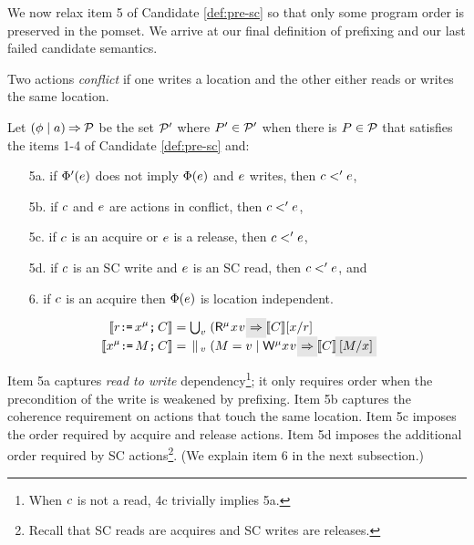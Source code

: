 We now relax item 5 of Candidate \ref{def:pre-sc} so that only some program
order is {preserved} in the pomset.  We arrive at our final definition of
prefixing and our last failed candidate semantics.
\begin{definition}
  \label{def:prefix}
Two actions \emph{conflict} if one writes a location and the other
either reads or writes the same location.

Let $(\phi \mid a) \mathbin\Rightarrow \mathcal{P}$ be the set $\mathcal{P}'$ where $P'\in\mathcal{P}'$ when
there is $P\in\mathcal{P}$ that satisfies the items 1-4 of
Candidate \ref{def:pre-sc} and:
\begin{enumerate}
\item[5a.] if %
  $\Phi'(e)$ does not imply $\Phi(e)$ and $e$ writes, then
  $c<'e$,
\item[5b.] if $c$ and $e$ are \external actions in conflict,
    then $c<'e$, %
\item[5c.] if $c$ is an acquire or $e$ is a release, then $c <' e$, 
\item[5d.] if $c$ is an SC write and $e$ is an SC read, then $c <' e$, and
\item[6.] if $c$ is an acquire then $\Phi(e)$
  is location independent.
\end{enumerate}
\end{definition}
\begin{candidate}
    \begin{align*}
    \sem{\aReg\GETS\aLoc^\amode\SEMI \aCmd} & =
    \textstyle\bigcup_\aVal\; (\DRmode\aLoc\aVal) \mathhl{\prefix}\; \sem{\aCmd} [\aLoc/\aReg] 
    \\
    \sem{\aLoc^\amode\GETS\aExp\SEMI \aCmd} & =
    \textstyle\PAR_\aVal\; (\aExp=\aVal \mid \DWmode\aLoc\aVal) \mathhl{\prefix}\; \sem{\aCmd}\mkern3.5mu\mathhl{[\aExp/\aLoc]}
  \end{align*}
\end{candidate}
Item 5a captures \emph{read to write} dependency\footnote{When $c$ is not a read,
  4c trivially implies 5a.}; it only requires order when the precondition of
the write is weakened by prefixing.  Item 5b captures the coherence
requirement on actions that touch the same location.  Item 5c imposes the
order required by acquire and release actions.  Item 5d imposes the
additional order required by SC actions\footnote{Recall that SC reads are
  acquires and SC writes are releases.}.  (We explain item 6 in the next subsection.)


